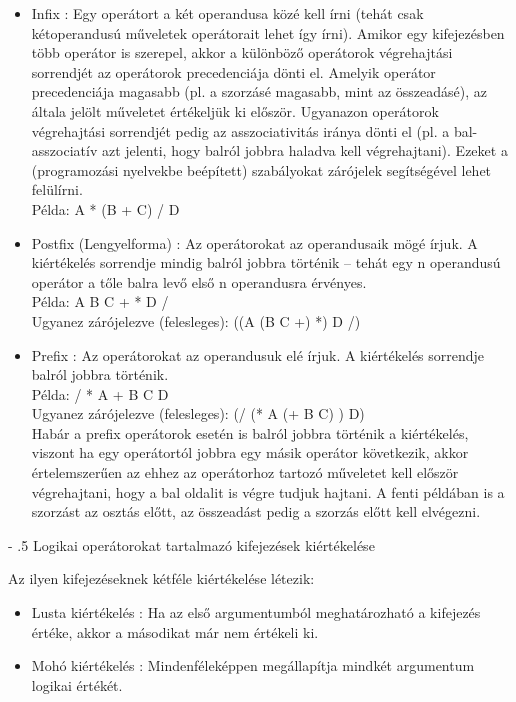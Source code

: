 \documentclass[margin=0px]{article}
\makeatletter
\renewcommand\paragraph{%
    \@startsection{paragraph}{4}{0mm}%
    {-\baselineskip}%
    {.5\baselineskip}%
    {\normalfont\normalsize\bfseries}}
\makeatother
\begin{document}
\begin{itemize}
    \item	Infix : Egy operátort a két operandusa közé kell írni (tehát csak kétoperandusú műveletek operátorait
          lehet így írni).
          Amikor egy kifejezésben több operátor is szerepel, akkor a különböző operátorok végrehajtási
          sorrendjét az operátorok precedenciája dönti el. Amelyik operátor precedenciája magasabb (pl. a
          szorzásé magasabb, mint az összeadásé), az általa jelölt műveletet értékeljük ki először. Ugyanazon
          operátorok végrehajtási sorrendjét pedig az asszociativitás iránya dönti el (pl. a bal-asszociatív azt
          jelenti, hogy balról jobbra haladva kell végrehajtani). Ezeket a (programozási nyelvekbe beépített)
          szabályokat zárójelek segítségével lehet felülírni.\\
          Példa: A * (B + C) / D

    \item	Postfix (Lengyelforma) : Az operátorokat az operandusaik mögé írjuk. A kiértékelés sorrendje mindig balról jobbra
          történik – tehát egy n operandusú operátor a tőle balra levő első n operandusra érvényes.\\
          Példa: A B C + * D /\\
          Ugyanez zárójelezve (felesleges): ((A (B C +) *) D /)

    \item	Prefix : Az operátorokat az operandusuk elé írjuk. A kiértékelés sorrendje balról
          jobbra történik.\\
          Példa: / * A + B C D\\
          Ugyanez zárójelezve (felesleges): (/ (* A (+ B C) ) D)\\
          Habár a prefix operátorok esetén is balról jobbra történik a kiértékelés, viszont ha egy operátortól
          jobbra egy másik operátor következik, akkor értelemszerűen az ehhez az operátorhoz tartozó
          műveletet kell először végrehajtani, hogy a bal oldalit is végre tudjuk hajtani. A fenti példában is a
          szorzást az osztás előtt, az összeadást pedig a szorzás előtt kell elvégezni.
\end{itemize}

\paragraph{Logikai operátorokat tartalmazó kifejezések kiértékelése}

\noindent Az ilyen kifejezéseknek kétféle kiértékelése létezik:
\begin{itemize}
    \item	Lusta kiértékelés : Ha az első argumentumból meghatározható a kifejezés értéke, akkor a másodikat
          már nem értékeli ki.
    \item	Mohó kiértékelés : Mindenféleképpen megállapítja mindkét argumentum logikai értékét.
\end{itemize}
\end{document}
